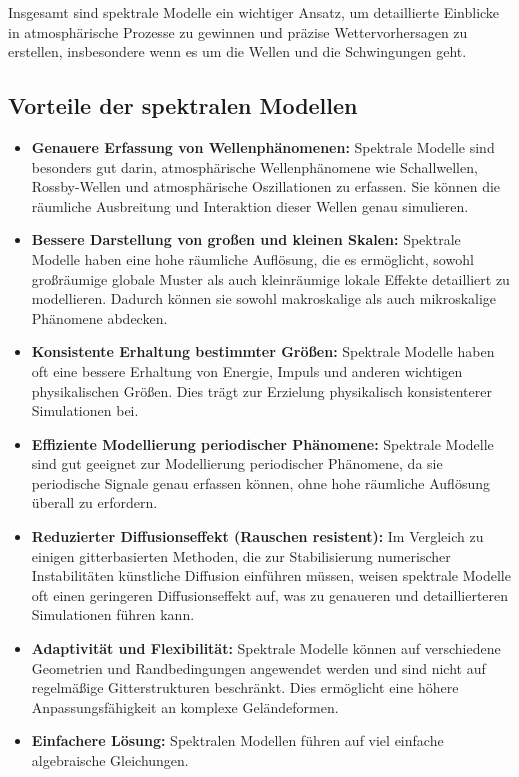 Insgesamt sind spektrale Modelle ein wichtiger Ansatz, um detaillierte Einblicke in atmosphärische Prozesse zu gewinnen und präzise Wettervorhersagen zu erstellen, insbesondere wenn es um die Wellen und die Schwingungen geht.

\subsection{Vorteile der spektralen Modellen
\label{spektral:subsection:vorteile}}

\begin{itemize}
\item
\textbf{Genauere Erfassung von Wellenphänomenen:} Spektrale Modelle sind besonders gut darin, atmosphärische Wellenphänomene wie Schallwellen, Rossby-Wellen und atmosphärische Oszillationen zu erfassen.
Sie können die räumliche Ausbreitung und Interaktion dieser Wellen genau simulieren.
\item
\textbf{Bessere Darstellung von großen und kleinen Skalen:} Spektrale Modelle haben eine hohe räumliche Auflösung, die es ermöglicht, sowohl großräumige globale Muster als auch kleinräumige lokale Effekte detailliert zu modellieren.
Dadurch können sie sowohl makroskalige als auch mikroskalige Phänomene abdecken.
\item
\textbf{Konsistente Erhaltung bestimmter Größen:} Spektrale Modelle haben oft eine bessere Erhaltung von Energie, Impuls und anderen wichtigen physikalischen Größen.
Dies trägt zur Erzielung physikalisch konsistenterer Simulationen bei.
\item
\textbf{Effiziente Modellierung periodischer Phänomene:} Spektrale Modelle sind gut geeignet zur Modellierung periodischer Phänomene, da sie periodische Signale genau erfassen können, ohne hohe räumliche Auflösung überall zu erfordern.
\item
\textbf{Reduzierter Diffusionseffekt (Rauschen resistent):} Im Vergleich zu einigen gitterbasierten Methoden, die zur Stabilisierung numerischer Instabilitäten künstliche Diffusion einführen müssen, weisen spektrale Modelle oft einen geringeren Diffusionseffekt auf, was zu genaueren und detaillierteren Simulationen führen kann.
\item
\textbf{Adaptivität und Flexibilität:} Spektrale Modelle können auf verschiedene Geometrien und Randbedingungen angewendet werden und sind nicht auf regelmäßige Gitterstrukturen beschränkt. Dies ermöglicht eine höhere Anpassungsfähigkeit an komplexe Geländeformen.
\item
\textbf{Einfachere Lösung:} Spektralen Modellen führen auf viel einfache algebraische Gleichungen.
\end{itemize}

